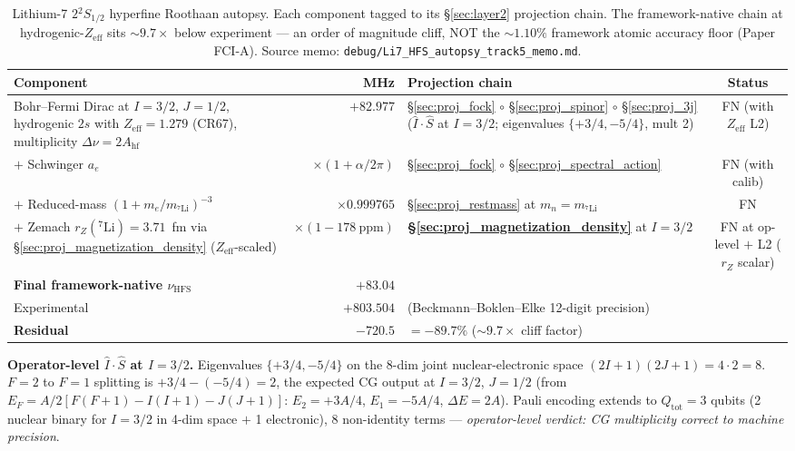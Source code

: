 \documentclass[11pt]{article}
\begin{document}
\begin{table}[h]
\centering\small
\begin{tabular}{p{4.8cm} r p{5.5cm} c}
\toprule
Component & MHz & Projection chain & Status \\
\midrule
Bohr--Fermi Dirac at $I=3/2$, $J=1/2$, hydrogenic $2s$
with $Z_\text{eff} = 1.279$ (CR67), multiplicity $\Delta\nu = 2 A_\text{hf}$ &
$+82.977$ &
\S\ref{sec:proj_fock} $\circ$ \S\ref{sec:proj_spinor} $\circ$
\S\ref{sec:proj_3j} ($\hat{I}\cdot\hat{S}$ at $I=3/2$;
eigenvalues $\{+3/4, -5/4\}$, mult 2) & FN (with $Z_\text{eff}$ L2) \\
$+$ Schwinger $a_e$ & $\times(1+\alpha/2\pi)$ &
\S\ref{sec:proj_fock} $\circ$ \S\ref{sec:proj_spectral_action} & FN (with calib) \\
$+$ Reduced-mass $(1+m_e/m_{{}^7\!\text{Li}})^{-3}$ & $\times 0.999765$ &
\S\ref{sec:proj_restmass} at $m_n = m_{{}^7\!\text{Li}}$ & FN \\
$+$ Zemach $r_Z({}^7\text{Li})=3.71$~fm via
\S\ref{sec:proj_magnetization_density} ($Z_\text{eff}$-scaled) &
$\times(1 - 178~\text{ppm})$ &
\textbf{\S\ref{sec:proj_magnetization_density}} at $I=3/2$ &
FN at op-level $+$ L2 ($r_Z$ scalar) \\
\midrule
\textbf{Final framework-native $\nu_\text{HFS}$} & $+83.04$ & & \\
Experimental & $+803.504$ & (Beckmann--Boklen--Elke 12-digit precision) & \\
\textbf{Residual} & $-720.5$ & $= -89.7\%$
($\sim 9.7\times$ cliff factor) & \\
\bottomrule
\end{tabular}
\caption{Lithium-7 $2{}^2S_{1/2}$ hyperfine Roothaan autopsy.  Each
component tagged to its \S\ref{sec:layer2} projection chain.  The
framework-native chain at hydrogenic-$Z_\text{eff}$ sits $\sim 9.7\times$
below experiment --- an order of magnitude cliff, NOT the
$\sim 1.10\%$ framework atomic accuracy floor (Paper FCI-A).  Source
memo: \texttt{debug/Li7\_HFS\_autopsy\_track5\_memo.md}.}
\label{tab:autopsy_li7_hfs}
\end{table}

\textbf{Operator-level $\hat{I}\cdot\hat{S}$ at $I=3/2$.}  Eigenvalues
$\{+3/4, -5/4\}$ on the 8-dim joint nuclear-electronic space
$(2I+1)(2J+1) = 4 \cdot 2 = 8$.  $F=2$ to $F=1$ splitting is
$+3/4 - (-5/4) = 2$, the expected CG output at $I=3/2$, $J=1/2$
(from $E_F = A/2[F(F+1) - I(I+1) - J(J+1)]$: $E_2 = +3A/4$,
$E_1 = -5A/4$, $\Delta E = 2A$).  Pauli encoding extends to
$Q_\text{tot} = 3$ qubits (2 nuclear binary for $I=3/2$ in 4-dim
space $+$ 1 electronic), 8 non-identity terms ---
\emph{operator-level verdict: CG multiplicity correct to machine precision}.
\end{document}

